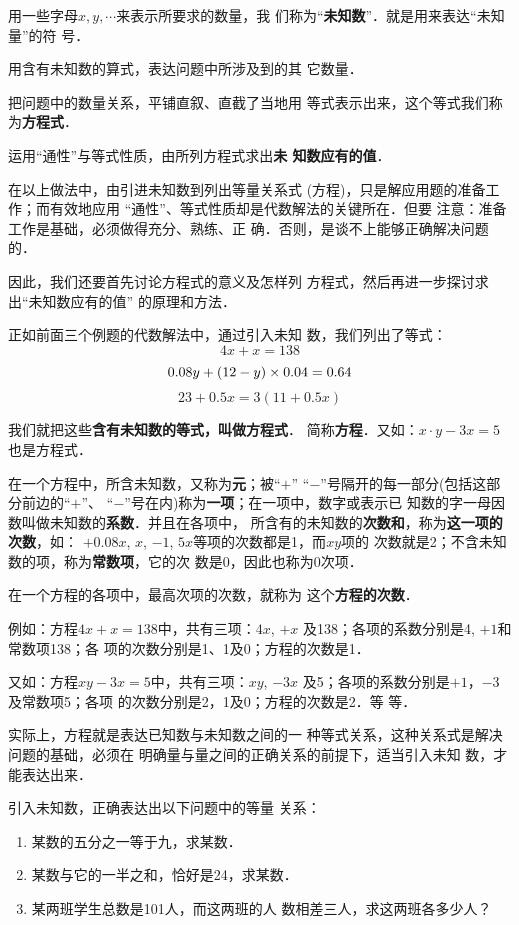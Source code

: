     用一些字母$x,  y,\cdots$来表示所要求的数量，我
们称为“\textbf{未知数}”．就是用来表达“未知量”的符
号．

    用含有未知数的算式，表达问题中所涉及到的其
它数量．

    把问题中的数量关系，平铺直叙、直截了当地用
等式表示出来，这个等式我们称为\textbf{方程式}．

    运用“通性”与等式性质，由所列方程式求出\textbf{未
知数应有的值}．

    在以上做法中，由引进未知数到列出等量关系式
  (方程)，只是解应用题的准备工作；而有效地应用
  “通性”、等式性质却是代数解法的关键所在．但要
注意：准备工作是基础，必须做得充分、熟练、正
确．否则，是谈不上能够正确解决问题的．

    因此，我们还要首先讨论方程式的意义及怎样列
方程式，然后再进一步探讨求出“未知数应有的值”
的原理和方法．

    正如前面三个例题的代数解法中，通过引入未知
数，我们列出了等式：
\[4x+x=138\]
\[0.08y+(12-y)\times 0.04=0.64\]
\[23+0.5x=3(11+0.5x)\]

我们就把这些\textbf{含有未知数的等式，叫做方程式}．
简称\textbf{方程}．又如：$x\cdot y-3x=5$也是方程式．

在一个方程中，所含未知数，又称为\textbf{元}；被“$+$”
“$-$”号隔开的每一部分(包括这部分前边的“$+$”、
“$-$”号在内)称为\textbf{一项}；在一项中，数字或表示已
知数的字一母因数叫做未知数的\textbf{系数}．并且在各项中，
所含有的未知数的\textbf{次数和}，称为\textbf{这一项的次数}，如：
$+ 0. 08x$,  $x$, $-1$, $5x$等项的次数都是1，而$xy$项的
次数就是2；不含未知数的项，称为\textbf{常数项}，它的次
数是0，因此也称为0次项．

  在一个方程的各项中，最高次项的次数，就称为
这个\textbf{方程的次数}．

  例如：方程$4x+x=138$中，共有三项：$4 x$, $+x$
及138；各项的系数分别是4, $+1$和常数项138；各
项的次数分别是1、1及0；方程的次数是1．

  又如：方程$xy-3x=5$中，共有三项：$xy$, $-3x$
及5；各项的系数分别是$+1$，$-3$及常数项5；各项
的次数分别是2，1及0；方程的次数是2．等
等．

  实际上，方程就是表达已知数与未知数之间的一
种等式关系，这种关系式是解决问题的基础，必须在
明确量与量之间的正确关系的前提下，适当引入未知
数，才能表达出来．

\begin{example}
引入未知数，正确表达出以下问题中的等量
关系：
\begin{enumerate}
    \item 某数的五分之一等于九，求某数．
    \item 某数与它的一半之和，恰好是24，求某数．
    \item 某两班学生总数是101人，而这两班的人
    数相差三人，求这两班各多少人？
\end{enumerate}
\end{example}

